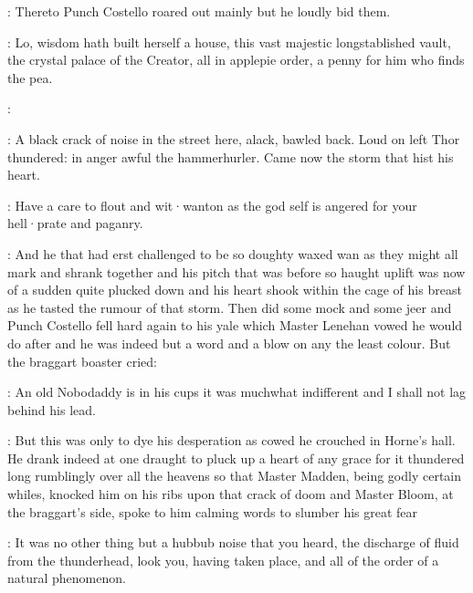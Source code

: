 
:
Thereto Punch Costello roared out mainly 
but he loudly bid them.

\stephen:
Lo,
wisdom hath built herself a house,
this vast majestic
longstablished vault,
the crystal palace of the Creator,
all in applepie
order,
a penny for him who finds the pea.

\stephen:



:
A black crack of noise in the street here,
alack,
bawled back.
Loud on left Thor thundered:
in anger awful the hammerhurler.
Came now the storm that hist his heart.

\lynch:
Have a care to flout and wit·wanton as the god self is angered for
your hell·prate and paganry.

:
And he that had erst challenged to be so doughty waxed wan as they
might all mark and shrank together and his pitch that was before so haught
uplift was now of a sudden quite plucked down and his heart shook within
the cage of his breast as he tasted the rumour of that storm.
Then did
some mock and some jeer and Punch Costello fell hard again to his yale
which Master Lenehan vowed he would do after and he was indeed but a word
and a blow on any the least colour.
But the braggart boaster cried:

\stephen:
An old Nobodaddy is in his cups it was muchwhat indifferent and
I shall not lag behind his lead.

:
But this was only to dye his desperation as cowed he
crouched in Horne's hall.
He drank indeed at one draught to pluck up a
heart of any grace for it thundered long rumblingly over all the heavens
so that Master Madden,
being godly certain whiles,
knocked him on his
ribs upon that crack of doom and Master Bloom,
at the braggart's side,
spoke to him calming words to slumber his great fear

\Bloom:
It was no other thing but a hubbub noise that you heard,
the
discharge of fluid from the thunderhead,
look you,
having taken place,
and all of the order of a natural phenomenon.



